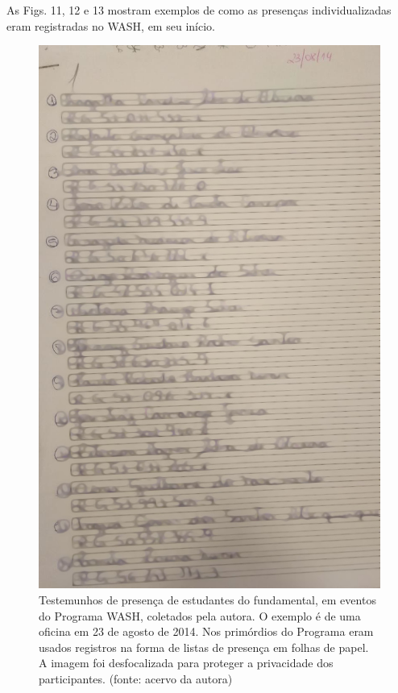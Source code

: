 As Figs. 11, 12 e 13 mostram exemplos de como as presenças individualizadas eram registradas no WASH, em seu início.



\captionsetup{format=plain}
\begin{figure}[p]

\centering


\begin{minipage}[b]{0.4\linewidth}
        \centering
                \includegraphics[width=1.0\linewidth]{../../../imagens/blurred-Presenca-Oficina-2014-08-23.jpeg}
                \caption{Testemunhos de presença de estudantes do fundamental, em eventos do Programa WASH, coletados pela autora. O exemplo é de uma oficina em 23 de agosto de 2014. Nos primórdios do Programa eram usados registros na forma de listas de presença em folhas de papel. A imagem foi desfocalizada para proteger a privacidade dos participantes. (fonte: acervo da autora)}

\end{minipage}
\end{figure}
